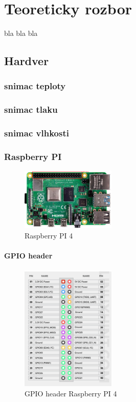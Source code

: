 \chapter{Teoreticky rozbor}
bla bla bla

\section{Hardver}
\subsection{snimac teploty}
\subsection{snimac tlaku}
\subsection{snimac vlhkosti}
\subsection{Raspberry PI}
\begin{figure}[h!]
    \centering
    \includegraphics[width=0.4\textwidth]{obrazky/RPi.png}
    \caption{Raspberry PI 4}
\end{figure}
\subsubsection{GPIO header}
\begin{figure}[h!]
    \centering
    \includegraphics[width=0.4\textwidth]{obrazky/gpio_header.png}
    \caption{GPIO header Raspberry PI 4}
\end{figure}
